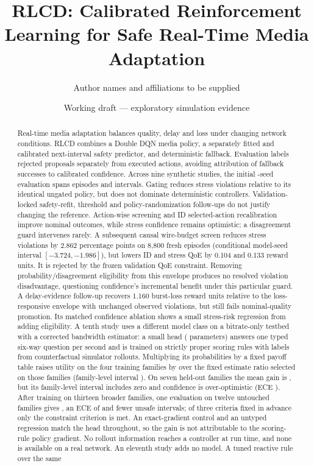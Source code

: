\documentclass[10pt]{article}
\title{RLCD: Calibrated Reinforcement Learning for Safe Real-Time Media Adaptation}
\author{Author names and affiliations to be supplied}
\date{Working draft --- exploratory simulation evidence}
\begin{document}
\maketitle

\begin{abstract}
Real-time media adaptation balances quality, delay and loss under changing network conditions. RLCD combines a Double DQN media policy, a separately fitted and calibrated next-interval safety predictor, and deterministic fallback. Evaluation labels rejected proposals separately from executed actions, avoiding attribution of fallback successes to calibrated confidence. Across nine synthetic studies, the initial \EvidenceNumSeeds{}-seed evaluation spans \EvidenceNumEpisodes{} episodes and \EvidenceNumSteps{} intervals. Gating reduces stress violations relative to its identical ungated policy, but does not dominate deterministic controllers. Validation-locked safety-refit, threshold and policy-randomization follow-ups do not justify changing the reference. Action-wise screening and ID selected-action recalibration improve nominal outcomes, while stress confidence remains optimistic; a disagreement guard intervenes rarely. A subsequent causal wire-budget screen reduces stress violations by 2.862 percentage points on 8,800 fresh episodes (conditional model-seed interval $[-3.724,-1.986]$), but lowers ID and stress QoE by 0.104 and 0.133 reward units. It is rejected by the frozen validation QoE constraint. Removing probability/disagreement eligibility from this envelope produces no resolved violation disadvantage, questioning confidence's incremental benefit under this particular guard. A delay-evidence follow-up recovers 1.160 burst-loss reward units relative to the loss-responsive envelope with unchanged observed violations, but still fails nominal-quality promotion. Its matched confidence ablation shows a small stress-risk regression from adding eligibility. A tenth study uses a different model class on a bitrate-only testbed with a corrected bandwidth estimator: a small head (\TypedParameters{} parameters) answers one typed six-way question per second and is trained on strictly proper scoring rules with labels from counterfactual simulator rollouts. Multiplying its probabilities by a fixed payoff table raises utility on the four training families by \TypedAuditIdBayesVsTrain{} over the fixed estimate ratio selected on those families (family-level interval \TypedAuditIdBayesVsTrainT{}). On seven held-out families the mean gain is \TypedAuditOodBayesVsTrain{}, but its family-level interval \TypedAuditOodBayesVsTrainT{} includes zero and confidence is over-optimistic (ECE \TypedAuditOodBayesEce{}). After training on thirteen broader families, one evaluation on twelve untouched families gives \TypedBroadTestOodBayesVsTrain{} \TypedBroadTestOodBayesVsTrainT{}, an ECE of \TypedBroadTestOodBayesEce{} and fewer unsafe intervals; of three criteria fixed in advance only the constraint criterion is met. An exact-gradient control and an untyped regression match the head throughout, so the gain is not attributable to the scoring-rule policy gradient. No rollout information reaches a controller at run time, and none is available on a real network. An eleventh study adds no model. A tuned reactive rule over the same 
\end{abstract}
\end{document}
